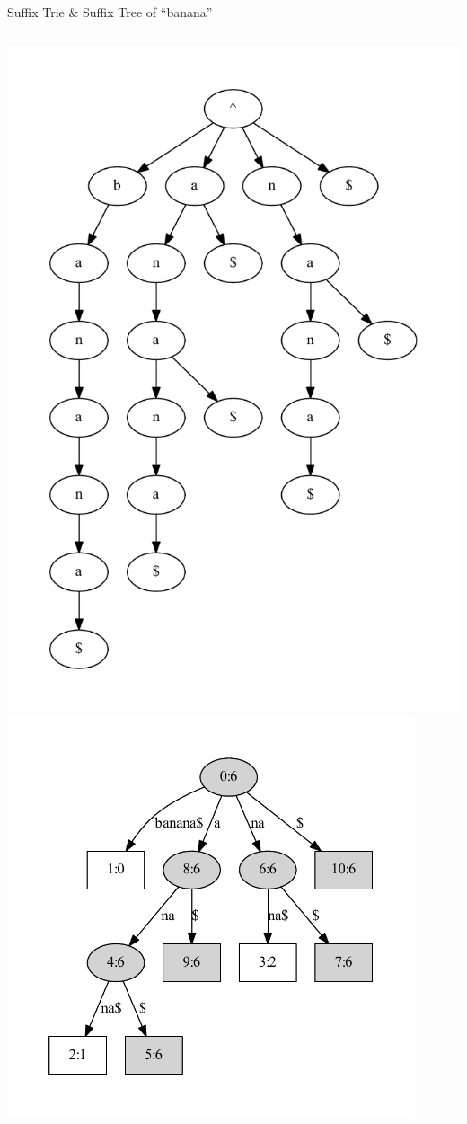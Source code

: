 \begin{frame}{Suffix Trie \& Suffix Tree of ``banana''}
\begin{columns}
\includegraphics[height=0.8\textheight,trim=40pt 40pt 40pt 40pt]{banana-strie.pdf}
\includegraphics[width=0.9\textwidth,trim=40pt 40pt 40pt 40pt]{banana-st.pdf}
\end{columns}
\end{frame}
